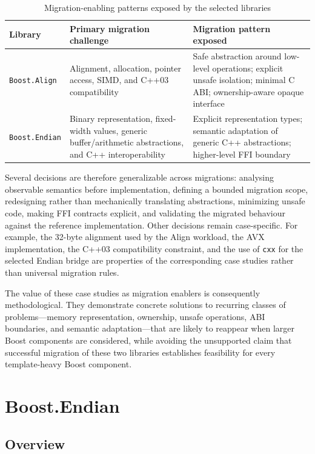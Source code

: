 \begin{table}[H]
\centering
\renewcommand{\arraystretch}{1.2}
\begin{tabularx}{\textwidth}{|l|X|X|}
\hline
\textbf{Library} & \textbf{Primary migration challenge} & \textbf{Migration pattern exposed} \\ \hline
\texttt{Boost.Align} & Alignment, allocation, pointer access, SIMD, and C++03 compatibility & Safe abstraction around low-level operations; explicit unsafe isolation; minimal C ABI; ownership-aware opaque interface \\ \hline
\texttt{Boost.Endian} & Binary representation, fixed-width values, generic buffer/arithmetic abstractions, and C++ interoperability & Explicit representation types; semantic adaptation of generic C++ abstractions; higher-level FFI boundary \\ \hline
\end{tabularx}
\caption{Migration-enabling patterns exposed by the selected libraries}
\label{tab:migration_enabling_patterns}
\end{table}

Several decisions are therefore generalizable across migrations: analysing observable semantics before implementation, defining a bounded migration scope, redesigning rather than mechanically translating abstractions, minimizing unsafe code, making FFI contracts explicit, and validating the migrated behaviour against the reference implementation. Other decisions remain case-specific. For example, the 32-byte alignment used by the Align workload, the AVX implementation, the C++03 compatibility constraint, and the use of \texttt{cxx} for the selected Endian bridge are properties of the corresponding case studies rather than universal migration rules.

The value of these case studies as migration enablers is consequently methodological. They demonstrate concrete solutions to recurring classes of problems—memory representation, ownership, unsafe operations, ABI boundaries, and semantic adaptation—that are likely to reappear when larger Boost components are considered, while avoiding the unsupported claim that successful migration of these two libraries establishes feasibility for every template-heavy Boost component.

\section{Boost.Endian}
\subsection{Overview}

